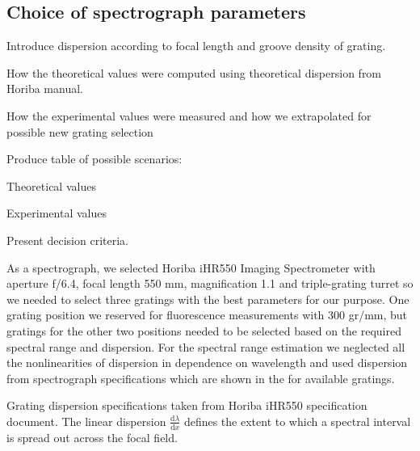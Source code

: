 \subsection{Choice of spectrograph parameters}
\begin{docitemize}
	\item Introduce dispersion according to focal length and groove density of
	grating.
	\begin{docitemize}
		\item How the theoretical values were computed using theoretical dispersion
			from Horiba manual.
		\item How the experimental values were measured and how we extrapolated
			for possible new grating selection
	\end{docitemize}
	\item Produce table of possible scenarios:
	\begin{docitemize}
		\item Theoretical values 
		\item Experimental values
	\end{docitemize}
	\item Present decision criteria.
\end{docitemize}


As a spectrograph, we selected Horiba iHR550 Imaging Spectrometer with aperture
f/6.4, focal length 550 mm, magnification 1.1 and triple-grating turret so we
needed to select three gratings with the best parameters for our purpose. One
grating position we reserved for fluorescence measurements with 300 gr/mm, but
gratings for the other two positions needed to be selected based on the
required spectral range and dispersion. For the spectral range estimation
we neglected all the nonlinearities of dispersion in dependence on wavelength
and used dispersion from spectrograph specifications which are shown in the
 for available gratings.


\begin{table}
	\centering
	
	\caption{Grating dispersion specifications taken from Horiba iHR550
		specification document. The linear dispersion
		$\frac{\text{d}\lambda}{\text{d}x}$ defines the extent to which a spectral
		interval is spread out across the focal field.}
	\label{\tablabel{spectrograph_selection:dispersion_spec}}
\end{table}


